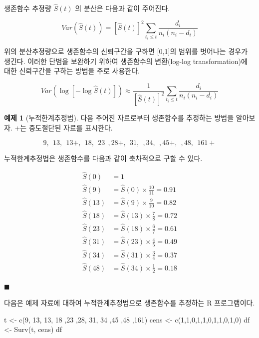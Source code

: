 \documentclass[
]{book}
\newenvironment{Shaded}{\begin{snugshade}}{\end{snugshade}}
\newcommand{\DecValTok}[1]{\textcolor[rgb]{0.00,0.00,0.81}{#1}}
\newcommand{\FunctionTok}[1]{\textcolor[rgb]{0.00,0.00,0.00}{#1}}
\newcommand{\NormalTok}[1]{#1}
\newcommand{\OtherTok}[1]{\textcolor[rgb]{0.56,0.35,0.01}{#1}}
\theoremstyle{definition}
\theoremstyle{definition}
\newtheorem{example}{예제}[chapter]
\theoremstyle{definition}
\theoremstyle{definition}
\theoremstyle{remark}
\begin{document}
생존함수 추정량 \(\hat S(t)\) 의 분산은 다음과 같이 주어진다.

\[ Var(\hat S(t)) = [\hat S(t)]^2 \sum_{t_i \le t} \frac{d_i}{n_i(n_i-d_i)} \]

위의 분산추정량으로 생존함수의 신뢰구간을 구하면 {[}0,1{]}의 범위를 벗어나는 경우가 생긴다. 이러한 단범을 보완하기 위하여 생존함수의 변환(log-log transformation)에 대한 신뢰구간을 구하는 방법을 주로 사용한다.

\[ Var\left ( \log \left [ - \log \hat S(t) \right ] \right )
\approx \frac{1}{[\hat S(t)]^2  } \sum_{t_i \le t} \frac{d_i}{n_i(n_i-d_i)} \]

\begin{example}[누적한계추정법]
\protect\hypertarget{exm:unnamed-chunk-8}{}{\label{exm:unnamed-chunk-8} {} }다음 주어진 자료로부터 생존함수를 추정하는 방법을 알아보자. \(+\)는 중도절단된 자료를 표시한다.

\[ 9,~~13,~~13+,~~18,~~23~~,28+,~~31,~~,34,~~,45+,~~,48,~~161+ \]

누적한계추정법은 생존함수를 다음과 같이 축차적으로 구할 수 있다.
\end{example}

\begin{align*}
\hat S(0) & = 1 \\
\hat S(9) & = \hat S(0) \times \frac{10}{11} = 0.91 \\
\hat S(13) & = \hat S(9) \times \frac{9}{10} = 0.82 \\
\hat S(18) & = \hat S(13) \times \frac{7}{8} = 0.72 \\
\hat S(23) & = \hat S(18) \times \frac{6}{7} = 0.61 \\
\hat S(31) & = \hat S(23) \times \frac{4}{5} = 0.49 \\
\hat S(34) & = \hat S(31) \times \frac{3}{4} = 0.37 \\
\hat S(48) & = \hat S(34) \times \frac{1}{2} = 0.18 
\end{align*}

\(\blacksquare\)

다음은 예제 자료에 대하여 누적한계추정법으로 생존함수를 추정하는
R 프로그램이다.

\begin{Shaded}
\begin{Highlighting}[]
\NormalTok{t }\OtherTok{\textless{}{-}} \FunctionTok{c}\NormalTok{(}\DecValTok{9}\NormalTok{, }\DecValTok{13}\NormalTok{, }\DecValTok{13}\NormalTok{, }\DecValTok{18}\NormalTok{ ,}\DecValTok{23}\NormalTok{ ,}\DecValTok{28}\NormalTok{, }\DecValTok{31}\NormalTok{, }\DecValTok{34}\NormalTok{ ,}\DecValTok{45}\NormalTok{ ,}\DecValTok{48}\NormalTok{ ,}\DecValTok{161}\NormalTok{) }
\NormalTok{cens }\OtherTok{\textless{}{-}} \FunctionTok{c}\NormalTok{(}\DecValTok{1}\NormalTok{,}\DecValTok{1}\NormalTok{,}\DecValTok{0}\NormalTok{,}\DecValTok{1}\NormalTok{,}\DecValTok{1}\NormalTok{,}\DecValTok{0}\NormalTok{,}\DecValTok{1}\NormalTok{,}\DecValTok{1}\NormalTok{,}\DecValTok{0}\NormalTok{,}\DecValTok{1}\NormalTok{,}\DecValTok{0}\NormalTok{)}
\NormalTok{df }\OtherTok{\textless{}{-}} \FunctionTok{Surv}\NormalTok{(t, cens)}
\NormalTok{df}
\end{Highlighting}
\end{Shaded}
\end{document}
